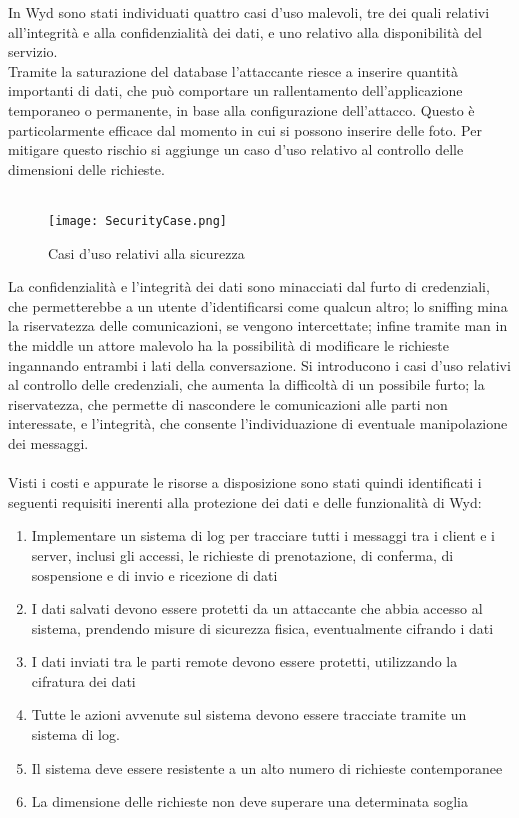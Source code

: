 In Wyd sono stati individuati quattro casi d'uso malevoli, 
tre dei quali relativi all'integrità e alla confidenzialità dei dati, 
e uno relativo alla disponibilità del servizio.\\
Tramite la saturazione del database l'attaccante 
riesce a inserire quantità importanti di dati,
che può comportare un rallentamento dell'applicazione temporaneo o permanente, 
in base alla configurazione dell'attacco. 
Questo è particolarmente efficace dal momento in cui si possono inserire delle foto.
Per mitigare questo rischio si aggiunge un caso d'uso relativo al controllo delle dimensioni delle richieste.\\
\\
\begin{figure}[hb]
    \begin{center}
        \texttt{[image: SecurityCase.png]}
        \caption{Casi d'uso relativi alla sicurezza}
    \end{center}
\end{figure}
\clearpage

La confidenzialità e l'integrità dei dati sono minacciati dal furto di credenziali,
che permetterebbe a un utente d'identificarsi come qualcun altro;
lo sniffing mina la riservatezza delle comunicazioni, se vengono intercettate;
infine tramite man in the middle un attore malevolo ha la possibilità di modificare le richieste 
ingannando entrambi i lati della conversazione.
Si introducono i casi d'uso relativi al controllo delle credenziali,
che aumenta la difficoltà di un possibile furto;
la riservatezza, che permette di nascondere le comunicazioni alle parti non interessate,
e l'integrità, che consente l'individuazione di eventuale manipolazione dei messaggi.\\
\\
Visti i costi e appurate le risorse a disposizione sono stati quindi identificati i seguenti requisiti
inerenti alla protezione dei dati e delle funzionalità di Wyd:

\begin{enumerate}
    \item Implementare un sistema di log per tracciare tutti i messaggi tra i client e i server, inclusi gli accessi, le richieste di prenotazione, di conferma, di sospensione e di invio e ricezione di dati
    \item I dati salvati devono essere protetti da un attaccante che abbia accesso al sistema, prendendo misure di sicurezza fisica, eventualmente cifrando i dati
    \item I dati inviati tra le parti remote devono essere protetti, utilizzando la cifratura dei dati
    \item Tutte le azioni avvenute sul sistema devono essere tracciate tramite un sistema di log.
    \item Il sistema deve essere resistente a un alto numero di richieste contemporanee
    \item La dimensione delle richieste non deve superare una determinata soglia
\end{enumerate}

